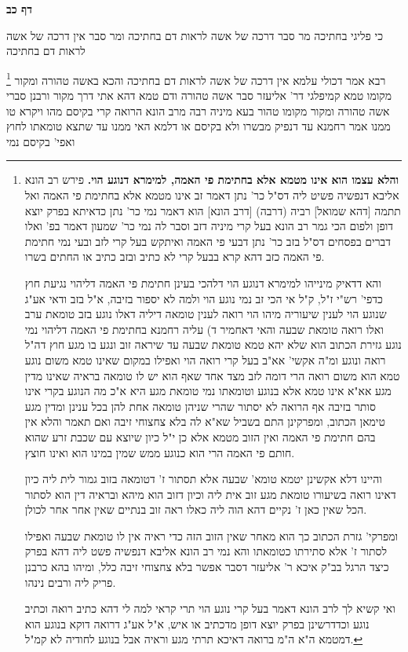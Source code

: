 \documentclass[12pt, openany]{book}
\newcommand{\sethebfont}{
\fontsize{10.5pt}{21.0pt} \selectfont
}
\newcommand{\twocol}[1]{
	{\sethebfont \begin{multicols}{2}
			#1
	\end{multicols}}	
}
\newcommand{\sectname}{}
\newcommand{\newsection}[1]{
	\addcontentsline{toc}{section}{#1}
	\renewcommand{\sectname}{#1}	
	\vspace{-\baselineskip}
	\begin{center}
		\textbf{%
\fontsize{16pt}{16pt}\selectfont
			#1}
	\end{center}
	\vspace{-\baselineskip}
	\nopagebreak
}
\newcommand{\footnotecomment}[1]{
	\renewcommand\thefootnote{}
	\footnote{#1}}
\newcommand{\commenta}[1]{\footnotecomment{#1}}
\begin{document}
\newsection{דף כב}
\twocol{כי פליגי בחתיכה מר סבר דרכה של אשה לראות דם בחתיכה ומר סבר אין דרכה של אשה לראות דם בחתיכה 
\commenta{\textbf{והלא עצמו הוא אינו מטמא אלא בחתימת פי האמה, למימרא דנוגע הוי.} פירש רב הונא אליבא דנפשיה פשיט ליה דס"ל כר' נתן דאמר זב אינו מטמא אלא בחתימת פי האמה ואל תתמה [דהא שמואל] רביה (דרבה) [דרב הונא] הוא דאמר נמי כר' נתן כדאיתא בפרק יוצא דופן ולפום הכי גמר רב הונא בעל קרי מיניה דזב וסבר לה נמי כר' שמעון דאמר בפ' ואלו דברים בפסחים דס"ל בזב כר' נתן דבעי פי האמה ואיתקש בעל קרי לזב ובעי נמי חתימת פי האמה כזב דהא קרא בבעל קרי לא כתיב ובזב כתיב או החתים בשרו.\par והא דדאיק מינייהו למימרא דנוגע הוי דלהכי בעינן חתימת פי האמה דליהוי נגיעת חוץ כדפי' רש"י ז"ל, ק"ל אי הכי זב נמי נוגע הוי ולמה לא יספור בזיבה, א"ל בזב ודאי אע"ג שנוגע הוי לענין שיעוריה מיהו הוי רואה לענין טומאה דיליה דאלו נוגע בזב טומאת ערב ואלו רואה טומאת שבעה והאי דאחמיר ד) עליה רחמנא בחתימת פי האמה דליהוי נמי נוגע גזירת הכתוב הוא שלא יהא טמא טומאת שבעה עד שיראה זוב ונגע בו מגע חוץ דה"ל רואה ונוגע ומ"ה אקשי' אא"ב בעל קרי רואה הוי ואפילו במקום שאינו טמא משום נוגע טמא הוא משום רואה הרי דומה לזב מצד אחד שאף הוא יש לו טומאה בראיה שאינו מדין מגע אא"א אינו טמא אלא בנוגע וטומאתו נמי טומאת מגע היא א"כ מה הנוגע בקרי אינו סותר בזיבה אף הרואה לא יסתור שהרי שניהן טומאה אחת להן בכל ענינן ומדין מגע טימאן הכתוב, ומפרקינן התם בשביל שא"א לה בלא צחצוחי זיבה ואם תאמר והלא אין בהם חתימת פי האמה ואין הזוב מטמא אלא כן י"ל כיון שיוצא עם שכבת זרע שהוא חותם פי האמה הרי הוא כנוגע ממש שמין במינו הוא ואינו חוצץ.\par והיינו דלא אקשינן יטמא טומא' שבעה אלא תסתור ז' דטומאה בזוב גמור לית ליה כיון דאינו רואה בשיעורו טומאת מגע זוב אית ליה וכיון דזוב הוא מיהא ובראיה דין הוא לסתור הכל שאין כאן ז' נקיים דהא הוה ליה כאלו ראה זוב בנתיים שאין אחר אחר לכולן.\par ומפרקי' גזרת הכתוב כך הוא מאחר שאין הזוב הזה כדי ראיה אין לו טומאת שבעה ואפילו לסתור ז' אלא סתירתו כטומאתו והא נמי רב הונא אליבא דנפשיה פשט ליה דהא בפרק כיצד הרגל בב"ק איכא ר' אליעזר דסבר אפשר בלא צחצוחי זיבה כלל, ומיהו בהא כרבנן פריק ליה ורבים נינהו.\par ואי קשיא לך לרב הונא דאמר בעל קרי נוגע הוי תרי קראי למה לי דהא כתיב רואה וכתיב נוגע וכדדרשינן בפרק יוצא דופן מדכתיב או איש, א"ל אע"ג דרואה דוקא בנוגע הוא דמטמא ה"א ה"מ ברואה דאיכא תרתי מגע וראיה אבל בנוגע לחודיה לא קמ"ל. }
רבא אמר דכולי עלמא אין דרכה של אשה לראות דם בחתיכה
והכא באשה טהורה ומקור מקומו טמא קמיפלגי דר' אליעזר סבר אשה טהורה ודם טמא דהא אתי דרך מקור ורבנן סברי אשה טהורה ומקור מקומו טהור 
בעא מיניה רבה מרב הונא הרואה קרי בקיסם מהו {ויקרא טו } ממנו אמר רחמנא עד דנפיק מבשרו ולא בקיסם או דלמא האי ממנו עד שתצא טומאתו לחוץ ואפי' בקיסם נמי 
}
\end{document}
